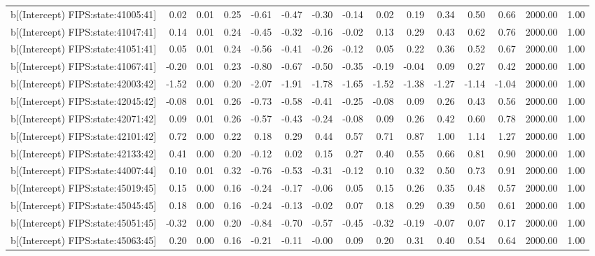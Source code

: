 \begin{table}[ht]
\begin{tabular}{rrrrrrrrrrrrrrr}
  b[(Intercept) FIPS:state:41005:41] & 0.02 & 0.01 & 0.25 & -0.61 & -0.47 & -0.30 & -0.14 & 0.02 & 0.19 & 0.34 & 0.50 & 0.66 & 2000.00 & 1.00 \\ 
  b[(Intercept) FIPS:state:41047:41] & 0.14 & 0.01 & 0.24 & -0.45 & -0.32 & -0.16 & -0.02 & 0.13 & 0.29 & 0.43 & 0.62 & 0.76 & 2000.00 & 1.00 \\ 
  b[(Intercept) FIPS:state:41051:41] & 0.05 & 0.01 & 0.24 & -0.56 & -0.41 & -0.26 & -0.12 & 0.05 & 0.22 & 0.36 & 0.52 & 0.67 & 2000.00 & 1.00 \\ 
  b[(Intercept) FIPS:state:41067:41] & -0.20 & 0.01 & 0.23 & -0.80 & -0.67 & -0.50 & -0.35 & -0.19 & -0.04 & 0.09 & 0.27 & 0.42 & 2000.00 & 1.00 \\ 
  b[(Intercept) FIPS:state:42003:42] & -1.52 & 0.00 & 0.20 & -2.07 & -1.91 & -1.78 & -1.65 & -1.52 & -1.38 & -1.27 & -1.14 & -1.04 & 2000.00 & 1.00 \\ 
  b[(Intercept) FIPS:state:42045:42] & -0.08 & 0.01 & 0.26 & -0.73 & -0.58 & -0.41 & -0.25 & -0.08 & 0.09 & 0.26 & 0.43 & 0.56 & 2000.00 & 1.00 \\ 
  b[(Intercept) FIPS:state:42071:42] & 0.09 & 0.01 & 0.26 & -0.57 & -0.43 & -0.24 & -0.08 & 0.09 & 0.26 & 0.42 & 0.60 & 0.78 & 2000.00 & 1.00 \\ 
  b[(Intercept) FIPS:state:42101:42] & 0.72 & 0.00 & 0.22 & 0.18 & 0.29 & 0.44 & 0.57 & 0.71 & 0.87 & 1.00 & 1.14 & 1.27 & 2000.00 & 1.00 \\ 
  b[(Intercept) FIPS:state:42133:42] & 0.41 & 0.00 & 0.20 & -0.12 & 0.02 & 0.15 & 0.27 & 0.40 & 0.55 & 0.66 & 0.81 & 0.90 & 2000.00 & 1.00 \\ 
  b[(Intercept) FIPS:state:44007:44] & 0.10 & 0.01 & 0.32 & -0.76 & -0.53 & -0.31 & -0.12 & 0.10 & 0.32 & 0.50 & 0.73 & 0.91 & 2000.00 & 1.00 \\ 
  b[(Intercept) FIPS:state:45019:45] & 0.15 & 0.00 & 0.16 & -0.24 & -0.17 & -0.06 & 0.05 & 0.15 & 0.26 & 0.35 & 0.48 & 0.57 & 2000.00 & 1.00 \\ 
  b[(Intercept) FIPS:state:45045:45] & 0.18 & 0.00 & 0.16 & -0.24 & -0.13 & -0.02 & 0.07 & 0.18 & 0.29 & 0.39 & 0.50 & 0.61 & 2000.00 & 1.00 \\ 
  b[(Intercept) FIPS:state:45051:45] & -0.32 & 0.00 & 0.20 & -0.84 & -0.70 & -0.57 & -0.45 & -0.32 & -0.19 & -0.07 & 0.07 & 0.17 & 2000.00 & 1.00 \\ 
  b[(Intercept) FIPS:state:45063:45] & 0.20 & 0.00 & 0.16 & -0.21 & -0.11 & -0.00 & 0.09 & 0.20 & 0.31 & 0.40 & 0.54 & 0.64 & 2000.00 & 1.00 \\ 

\end{tabular}
\end{table}
